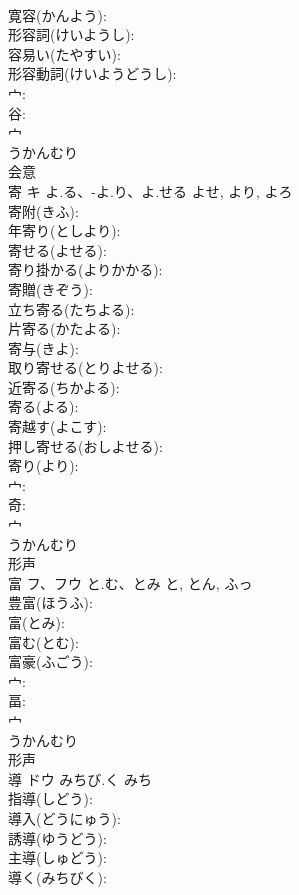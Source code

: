 \documentclass[8pt]{extreport}
\begin{document}
\begin{CJK}{UTF8}{min}
\\	寛容(かんよう): 
\\	形容詞(けいようし): 
\\	容易い(たやすい): 
\\	形容動詞(けいようどうし): 
\\	宀: 
\\	谷: 
\\	宀	
\\	うかんむり	
\\	会意 
\\	寄	キ	よ.る、-よ.り、よ.せる	よせ, より, よろ	
\\	寄附(きふ): 
\\	年寄り(としより): 
\\	寄せる(よせる): 
\\	寄り掛かる(よりかかる): 
\\	寄贈(きぞう): 
\\	立ち寄る(たちよる): 
\\	片寄る(かたよる): 
\\	寄与(きよ): 
\\	取り寄せる(とりよせる): 
\\	近寄る(ちかよる): 
\\	寄る(よる): 
\\	寄越す(よこす): 
\\	押し寄せる(おしよせる): 
\\	寄り(より): 
\\	宀: 
\\	奇: 
\\	宀	
\\	うかんむり	
\\	形声 
\\	富	フ、フウ	と.む、とみ	と, とん, ふっ	
\\	豊富(ほうふ): 
\\	富(とみ): 
\\	富む(とむ): 
\\	富豪(ふごう): 
\\	宀: 
\\	畐: 
\\	宀	
\\	うかんむり	
\\	形声 
\\	導	ドウ	みちび.く	みち	
\\	指導(しどう): 
\\	導入(どうにゅう): 
\\	誘導(ゆうどう): 
\\	主導(しゅどう): 
\\	導く(みちびく): 

\end{CJK}
\end{document}
